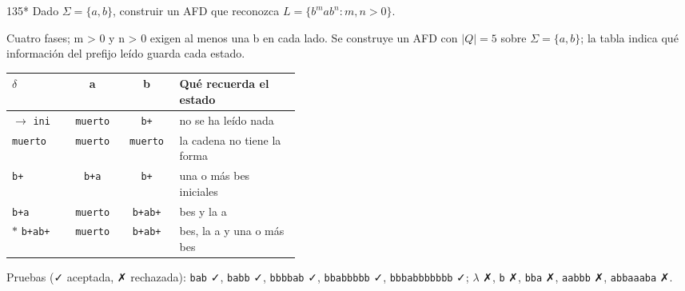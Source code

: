 \documentclass[11pt]{article}
\begin{document}
\begin{ejercicio}{135}{*}
Dado $\Sigma = \{a, b\}$, construir un AFD que reconozca $L = \{b^m a b^n : m, n > 0\}$.
\end{ejercicio}
\proc Cuatro fases; m > 0 y n > 0 exigen al menos una b en cada lado. Se construye un AFD con $|Q| = 5$ sobre $\Sigma = \{a, b\}$; la tabla indica qué información del prefijo leído guarda cada estado.
\begin{center}\small\begin{tabular}{lccp{0.42\linewidth}}\toprule
$\delta$ & a & b & Qué recuerda el estado \\\midrule
$\to$ \texttt{ini} & \texttt{muerto} & \texttt{b+} & no se ha leído nada \\
 \texttt{muerto} & \texttt{muerto} & \texttt{muerto} & la cadena no tiene la forma \\
 \texttt{b+} & \texttt{b+a} & \texttt{b+} & una o más bes iniciales \\
 \texttt{b+a} & \texttt{muerto} & \texttt{b+ab+} & bes y la a \\
$*$ \texttt{b+ab+} & \texttt{muerto} & \texttt{b+ab+} & bes, la a y una o más bes \\
\bottomrule\end{tabular}\end{center}
Pruebas (✓ aceptada, ✗ rechazada): \texttt{bab} ✓, \texttt{babb} ✓, \texttt{bbbbab} ✓, \texttt{bbabbbbb} ✓, \texttt{bbbabbbbbbb} ✓; $\lambda$ ✗, \texttt{b} ✗, \texttt{bba} ✗, \texttt{aabbb} ✗, \texttt{abbaaaba} ✗.
\end{document}
